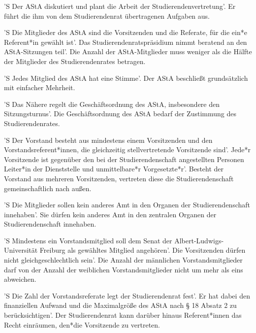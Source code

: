 \documentclass[fontsize=12pt,parskip=half]{scrartcl}
\begin{document}
\begin{contract}


  'S Der AStA diskutiert und plant die Arbeit der Studierendenvertretung'. Er führt
  die ihm von dem Studierendenrat übertragenen Aufgaben aus.

  'S Die Mitglieder des AStA sind die Vorsitzenden und die Referate, für die ein*e
  Referent*in gewählt ist'. Das Studierendenratspräsidium nimmt beratend an den
  AStA-Sitzungen teil'. Die Anzahl der AStA-Mitglieder muss weniger als die
  Hälfte der Mitglieder des Studierendenrates betragen.

  'S Jedes Mitglied des AStA hat eine Stimme'. Der AStA beschließt grundsätzlich mit
  einfacher Mehrheit.

  'S Das Nähere regelt die Geschäftsordnung des AStA, insbesondere den
  Sitzungsturnus'. Die Geschäftsordnung des AStA bedarf der Zustimmung des
  Studierendenrates.



  'S Der Vorstand besteht aus mindestens einem Vorsitzenden und den
  Vorstandsreferent*innen, die gleichzeitig stellvertretende Vorsitzende sind'.
  Jede*r Vorsitzende ist gegenüber den bei der Studierendenschaft angestellten
  Personen Leiter*in der Dienststelle und unmittelbare*r Vorgesetzte*r'. Besteht
  der Vorstand aus mehreren Vorsitzenden, vertreten diese die Studierendenschaft
  gemeinschaftlich nach außen.

  'S Die Mitglieder sollen kein anderes Amt in den Organen der Studierendenschaft
  innehaben'. Sie dürfen kein anderes Amt in den zentralen Organen der
  Studierendenschaft innehaben.

  'S Mindestens ein Vorstandsmitglied soll dem Senat der Albert-Ludwigs-Universität
  Freiburg als gewähltes Mitglied angehören'. Die Vorsitzenden dürfen nicht
  gleichgeschlechtlich sein'. Die Anzahl der männlichen Vorstandsmitglieder darf
  von der Anzahl der weiblichen Vorstandsmitglieder nicht um mehr als eins
  abweichen.

  'S Die Zahl der Vorstandsreferate legt der Studierendenrat fest'. Er hat dabei den
  finanziellen Aufwand und die Maximalgröße des AStA nach § 18 Absatz 2 zu
  berücksichtigen'. Der Studierendenrat kann darüber hinaus Referent*innen das
  Recht einräumen, den*die Vorsitzende zu vertreten.




\end{contract}
\end{document}
